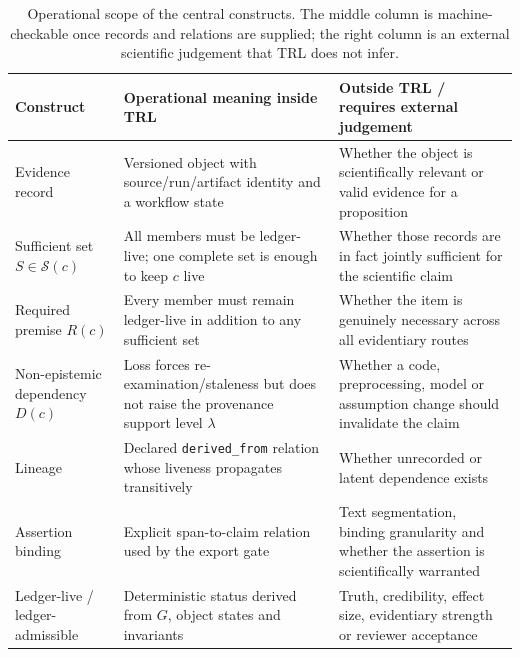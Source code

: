 \documentclass[journal]{IEEEtran}
\begin{document}
\begin{table}[t]
\centering
\caption{Operational scope of the central constructs. The middle column is machine-checkable once records and relations are supplied; the right column is an external scientific judgement that TRL does not infer.}
\label{tab:constructs}
\scriptsize
\begin{tabularx}{\textwidth}{p{2.5cm}>{\raggedright\arraybackslash}X>{\raggedright\arraybackslash}X}
\toprule
Construct & Operational meaning inside TRL & Outside TRL / requires external judgement \\
\midrule
Evidence record & Versioned object with source/run/artifact identity and a workflow state & Whether the object is scientifically relevant or valid evidence for a proposition \\
Sufficient set $S\in\mathcal{S}(c)$ & All members must be ledger-live; one complete set is enough to keep $c$ live & Whether those records are in fact jointly sufficient for the scientific claim \\
Required premise $R(c)$ & Every member must remain ledger-live in addition to any sufficient set & Whether the item is genuinely necessary across all evidentiary routes \\
Non-epistemic dependency $D(c)$ & Loss forces re-examination/staleness but does not raise the provenance support level $\lambda$ & Whether a code, preprocessing, model or assumption change should invalidate the claim \\
Lineage & Declared \texttt{derived\_from} relation whose liveness propagates transitively & Whether unrecorded or latent dependence exists \\
Assertion binding & Explicit span-to-claim relation used by the export gate & Text segmentation, binding granularity and whether the assertion is scientifically warranted \\
Ledger-live / ledger-admissible & Deterministic status derived from $G$, object states and invariants & Truth, credibility, effect size, evidentiary strength or reviewer acceptance \\
\bottomrule
\end{tabularx}
\end{table}
\end{document}
